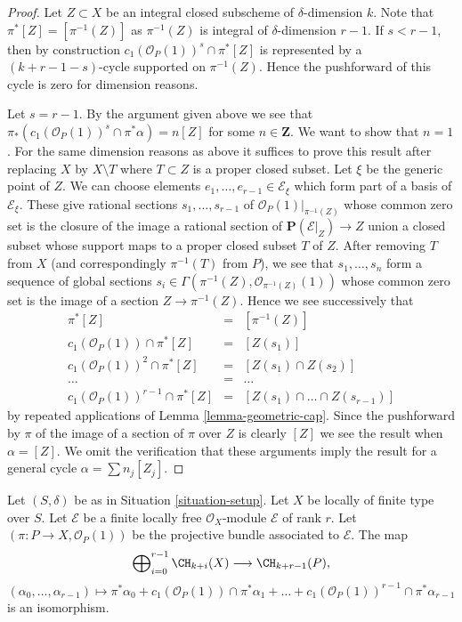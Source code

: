 \begin{proof}
Let $Z \subset X$ be an integral closed subscheme of $\delta$-dimension $k$.
Note that $\pi^*[Z] = [\pi^{-1}(Z)]$ as $\pi^{-1}(Z)$ is integral of
$\delta$-dimension $r - 1$.
If $s < r - 1$, then by construction
$c_1(\mathcal{O}_P(1))^s \cap \pi^*[Z]$
is represented by a $(k + r - 1 - s)$-cycle supported on
$\pi^{-1}(Z)$. Hence the pushforward of this cycle
is zero for dimension reasons.

\medskip\noindent
Let $s = r - 1$. By the argument given above we see that
$\pi_*(c_1(\mathcal{O}_P(1))^s \cap \pi^*\alpha) = n [Z]$
for some $n \in \mathbf{Z}$. We want to show that $n = 1$.
For the same dimension reasons
as above it suffices to prove this result after replacing $X$ by
$X \setminus T$ where $T \subset Z$ is a proper closed subset.
Let $\xi$ be the generic point of $Z$.
We can choose elements $e_1, \ldots, e_{r - 1} \in \mathcal{E}_\xi$
which form part of a basis of $\mathcal{E}_\xi$.
These give rational sections $s_1, \ldots, s_{r - 1}$
of $\mathcal{O}_P(1)|_{\pi^{-1}(Z)}$ whose common zero set
is the closure of the image a rational section of
$\mathbf{P}(\mathcal{E}|_Z) \to Z$ union a closed subset whose
support maps to a proper closed subset $T$ of $Z$.
After removing $T$ from $X$ (and correspondingly $\pi^{-1}(T)$
from $P$), we see that $s_1, \ldots, s_n$ form a sequence
of global sections
$s_i \in \Gamma(\pi^{-1}(Z), \mathcal{O}_{\pi^{-1}(Z)}(1))$
whose common zero set is the image of a section $Z \to \pi^{-1}(Z)$.
Hence we see successively that
\begin{eqnarray*}
\pi^*[Z] & = & [\pi^{-1}(Z)] \\
c_1(\mathcal{O}_P(1)) \cap \pi^*[Z] & = & [Z(s_1)] \\
c_1(\mathcal{O}_P(1))^2 \cap \pi^*[Z] & = & [Z(s_1) \cap Z(s_2)] \\
\ldots & = & \ldots \\
c_1(\mathcal{O}_P(1))^{r - 1} \cap \pi^*[Z] & = &
[Z(s_1) \cap \ldots \cap Z(s_{r - 1})]
\end{eqnarray*}
by repeated applications of Lemma \ref{lemma-geometric-cap}.
Since the pushforward by $\pi$ of the image of a
section of $\pi$ over $Z$ is clearly $[Z]$ we see the result
when $\alpha = [Z]$. We omit the verification that these
arguments imply the result for a general cycle $\alpha = \sum n_j [Z_j]$.
\end{proof}

\begin{lemma}
\label{lemma-chow-ring-projective-bundle}
Let $(S, \delta)$ be as in Situation \ref{situation-setup}.
Let $X$ be locally of finite type over $S$.
Let $\mathcal{E}$ be a finite locally free $\mathcal{O}_X$-module
$\mathcal{E}$ of rank $r$. Let $(\pi : P \to X, \mathcal{O}_P(1))$
be the projective bundle associated to $\mathcal{E}$.
The map
$$
\bigoplus\nolimits_{i = 0}^{r - 1}
\CH_{k + i}(X)
\longrightarrow
\CH_{k + r - 1}(P),
$$
$$
(\alpha_0, \ldots, \alpha_{r-1})
\longmapsto
\pi^*\alpha_0 +
c_1(\mathcal{O}_P(1)) \cap \pi^*\alpha_1
+ \ldots +
c_1(\mathcal{O}_P(1))^{r - 1} \cap \pi^*\alpha_{r-1}
$$
is an isomorphism.
\end{lemma}

